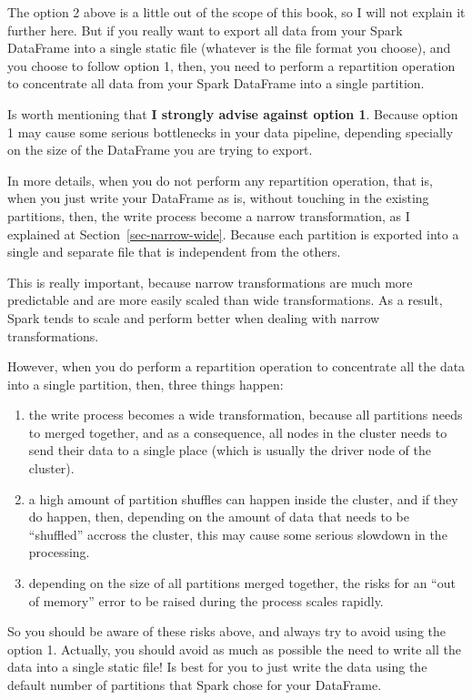 \documentclass[
  11pt,
  letterpaper,
  DIV=11,
  numbers=noendperiod]{scrreprt}
\begin{document}
The option 2 above is a little out of the scope of this book, so I will
not explain it further here. But if you really want to export all data
from your Spark DataFrame into a single static file (whatever is the
file format you choose), and you choose to follow option 1, then, you
need to perform a repartition operation to concentrate all data from
your Spark DataFrame into a single partition.

Is worth mentioning that \textbf{I strongly advise against option 1}.
Because option 1 may cause some serious bottlenecks in your data
pipeline, depending specially on the size of the DataFrame you are
trying to export.

In more details, when you do not perform any repartition operation, that
is, when you just write your DataFrame as is, without touching in the
existing partitions, then, the write process become a narrow
transformation, as I explained at Section~\ref{sec-narrow-wide}. Because
each partition is exported into a single and separate file that is
independent from the others.

This is really important, because narrow transformations are much more
predictable and are more easily scaled than wide transformations. As a
result, Spark tends to scale and perform better when dealing with narrow
transformations.

However, when you do perform a repartition operation to concentrate all
the data into a single partition, then, three things happen:

\begin{enumerate}
\def\labelenumi{\arabic{enumi}.}
\item
  the write process becomes a wide transformation, because all
  partitions needs to merged together, and as a consequence, all nodes
  in the cluster needs to send their data to a single place (which is
  usually the driver node of the cluster).
\item
  a high amount of partition shuffles can happen inside the cluster, and
  if they do happen, then, depending on the amount of data that needs to
  be ``shuffled'' accross the cluster, this may cause some serious
  slowdown in the processing.
\item
  depending on the size of all partitions merged together, the risks for
  an ``out of memory'' error to be raised during the process scales
  rapidly.
\end{enumerate}

So you should be aware of these risks above, and always try to avoid
using the option 1. Actually, you should avoid as much as possible the
need to write all the data into a single static file! Is best for you to
just write the data using the default number of partitions that Spark
chose for your DataFrame.
\end{document}
